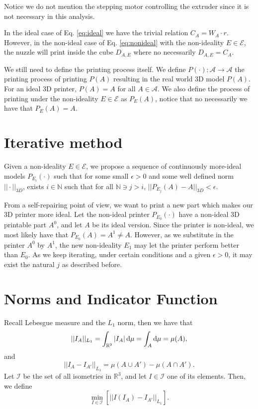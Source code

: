 \documentclass[conference]{IEEEtran}
\newcommand{\R}{\mathbb{R}}
\newcommand{\N}{\mathbb{N}}
\begin{document}
Notice we do not mention the stepping motor controlling the extruder since it is not necessary in this analysis.

In the ideal case of Eq. \ref{eq:ideal} we have the trivial relation $C_A=W_A\cdot r$. However, in the non-ideal case of Eq. \ref{eq:nonideal} with the non-ideality $E\in\mathcal{E}$, the nuzzle will print inside the cube $D_{A,E}$ where no necessarily $D_{A,E}=C_A$.

We still need to define the printing process itself. We define $P(\cdot):\mathcal{A}\to\mathcal{A}$ the printing process of printing $P(A)$ resulting in the real world 3D model $P(A)$. For an ideal 3D printer, $P(A)=A$ for all $A\in\mathcal{A}$. We also define the process of printing under the non-ideality $E\in\mathcal{E}$ as $P_E(A)$, notice that no necessarily we have that $P_E(A)=A$.

\section{Iterative method}

Given a non-ideality $E\in\mathcal{E}$, we propose a sequence of continuously more-ideal models $P_{E_i}(\cdot)$ such that for some small $\epsilon>0$ and some well defined norm $||\cdot||_{3D}$, exists $i\in\N$ such that for all $\N\ni j>i$, $||P_{E_j}(A)-A||_{3D}<\epsilon$.

From a self-repairing point of view, we want to print a new part which makes our 3D printer more ideal. Let the non-ideal printer $P_{E_0}(\cdot)$ have a non-ideal 3D printable part $A^0$, and let $A$ be its ideal version. Since the printer is non-ideal, we most likely have that $P_{E_0}(A)=A^1\neq A$. However, as we substitute in the printer $A^0$ by $A^1$, the new non-ideality $E_1$ may let the printer perform better than $E_0$. As we keep iterating, under certain conditions and a given $\epsilon>0$, it may exist the natural $j$ as described before.

\section{Norms and Indicator Function}
{\color{red}
Recall Lebesgue measure and the $L_1$ norm, then we have that
\begin{equation}
||I_A||_{L_1}=\int_{\R^3}|I_A|\dif\mu=\int_A\dif\mu=\mu(A),
\end{equation}
and
\begin{equation}
||I_A-I_{A'}||_{L_1}=\mu(A\cup A')-\mu(A\cap A').
\end{equation}
Let $\mathcal{I}$ be the set of all isometries in $\R^3$, and let $I\in\mathcal{I}$ one of its elements. Then, we define
\begin{equation}
\min_{I\in\mathcal{I}}\left[||I(I_A)-I_{A'}||_{L_1}\right].
\end{equation}
}
\end{document}
